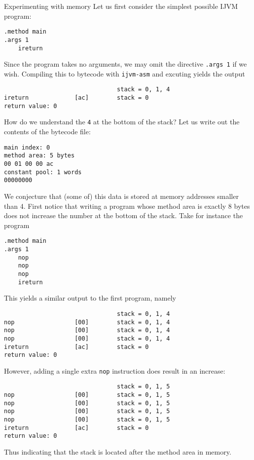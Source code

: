 \documentclass[article, a4paper, 11pt, oneside]{memoir}
\numberwithin{equation}{chapter}
\newcommand{\inlinecode}[1]{\colorbox{lightgray}{\vphantom{\texttt{jk}}\lstinline$#1$}}
\renewcommand{\inlinecode}{\lstinline}
\begin{document}
\begin{notelist}
\item[Experimenting with memory]
Let us first consider the simplest possible IJVM program:
%
\begin{lstlisting}
.method main
.args 1
    ireturn
\end{lstlisting}
%
Since the program takes no arguments, we may omit the directive \inlinecode{.args 1} if we wish. Compiling this to bytecode with \inlinecode{ijvm-asm} and excuting yields the output
%
\begin{lstlisting}
                                stack = 0, 1, 4
ireturn             [ac]        stack = 0
return value: 0
\end{lstlisting}
%
How do we understand the \inlinecode{4} at the bottom of the stack? Let us write out the contents of the bytecode file:
%
\begin{lstlisting}
main index: 0
method area: 5 bytes
00 01 00 00 ac 
constant pool: 1 words
00000000    
\end{lstlisting}
%
We conjecture that (some of) this data is stored at memory addresses smaller than 4. First notice that writing a program whose method area is exactly 8 bytes does not increase the number at the bottom of the stack. Take for instance the program
%
\begin{lstlisting}
.method main
.args 1
    nop
    nop
    nop
    ireturn
\end{lstlisting}
%
This yields a similar output to the first program, namely
%
\begin{lstlisting}
                                stack = 0, 1, 4
nop                 [00]        stack = 0, 1, 4
nop                 [00]        stack = 0, 1, 4
nop                 [00]        stack = 0, 1, 4
ireturn             [ac]        stack = 0
return value: 0
\end{lstlisting}
%
However, adding a single extra \inlinecode{nop} instruction does result in an increase:
%
\begin{lstlisting}
                                stack = 0, 1, 5
nop                 [00]        stack = 0, 1, 5
nop                 [00]        stack = 0, 1, 5
nop                 [00]        stack = 0, 1, 5
nop                 [00]        stack = 0, 1, 5
ireturn             [ac]        stack = 0
return value: 0
\end{lstlisting}
%
Thus indicating that the stack is located after the method area in memory.


\end{notelist}
\end{document}
